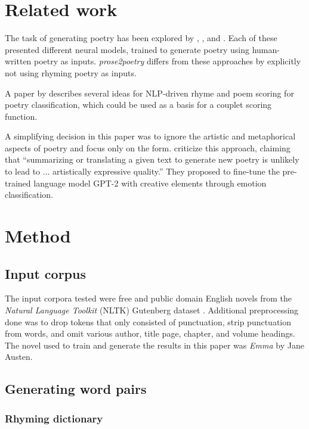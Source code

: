 \documentclass[11pt,a4paper]{article}
\begin{document}
\section{Related work}
\label{sec:related}

The task of generating poetry has been explored by \citet{cole}, \citet{hopkins-kiela-2017}, and \citet{Xie2017DeepP}. Each of these presented different neural models, trained to generate poetry using human-written poetry as inputs. \textit{prose2poetry} differs from these approaches by explicitly not using rhyming poetry as inputs.

A paper by \citet{keswarani} describes several ideas for NLP-driven rhyme and poem scoring for poetry classification, which could be used as a basis for a couplet scoring function.

A simplifying decision in this paper was to ignore the artistic and metaphorical aspects of poetry and focus only on the form. \citet{bena2020introducing} criticize this approach, claiming that ``summarizing or translating a given text to generate new poetry is unlikely to lead to ... artistically expressive quality.'' They proposed to fine-tune the pre-trained language model GPT-2 \cite{gpt2} with creative elements through emotion classification.

\section{Method}
\label{sec:method}

\subsection{Input corpus}

The input corpora tested were free and public domain English novels from the \textit{Natural Language Toolkit} (NLTK) Gutenberg dataset \cite[Chapter~2]{gutenbergnltk}. Additional preprocessing done was to drop tokens that only consisted of punctuation, strip punctuation from words, and omit various author, title page, chapter, and volume headings. The novel used to train and generate the results in this paper was \textit{Emma} by Jane Austen.

\subsection{Generating word pairs}

\subsubsection{Rhyming dictionary}
\end{document}
